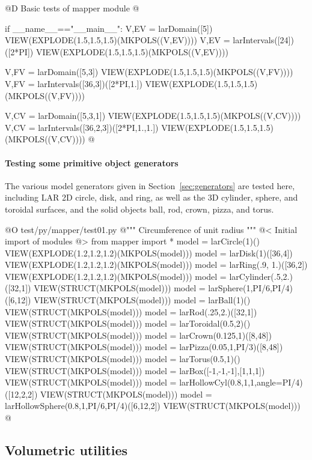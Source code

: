 \documentclass[11pt,oneside]{article}	%
\begin{document}
@D Basic tests of mapper module
@{if __name__=="__main__":
	V,EV = larDomain([5])
	VIEW(EXPLODE(1.5,1.5,1.5)(MKPOLS((V,EV))))
	V,EV = larIntervals([24])([2*PI])
	VIEW(EXPLODE(1.5,1.5,1.5)(MKPOLS((V,EV))))
		
	V,FV = larDomain([5,3])
	VIEW(EXPLODE(1.5,1.5,1.5)(MKPOLS((V,FV))))
	V,FV = larIntervals([36,3])([2*PI,1.])
	VIEW(EXPLODE(1.5,1.5,1.5)(MKPOLS((V,FV))))
		
	V,CV = larDomain([5,3,1])
	VIEW(EXPLODE(1.5,1.5,1.5)(MKPOLS((V,CV))))
	V,CV = larIntervals([36,2,3])([2*PI,1.,1.])
	VIEW(EXPLODE(1.5,1.5,1.5)(MKPOLS((V,CV))))
@}

\paragraph{Testing some primitive object generators}
The various model generators given in Section~\ref{sec:generators} are tested here, including LAR 2D circle, disk, and ring, as well as the 3D cylinder, sphere, and toroidal surfaces, and the solid objects ball, rod, crown, pizza, and torus.

@O test/py/mapper/test01.py
@{""" Circumference of unit radius """
@< Initial import of modules @>
from mapper import *
model = larCircle(1)()
VIEW(EXPLODE(1.2,1.2,1.2)(MKPOLS(model)))
model = larDisk(1)([36,4])
VIEW(EXPLODE(1.2,1.2,1.2)(MKPOLS(model)))
model = larRing(.9, 1.)([36,2])
VIEW(EXPLODE(1.2,1.2,1.2)(MKPOLS(model)))
model = larCylinder(.5,2.)([32,1])
VIEW(STRUCT(MKPOLS(model)))
model = larSphere(1,PI/6,PI/4)([6,12])
VIEW(STRUCT(MKPOLS(model)))
model = larBall(1)()
VIEW(STRUCT(MKPOLS(model)))
model = larRod(.25,2.)([32,1])
VIEW(STRUCT(MKPOLS(model)))
model = larToroidal(0.5,2)()
VIEW(STRUCT(MKPOLS(model)))
model = larCrown(0.125,1)([8,48])
VIEW(STRUCT(MKPOLS(model)))
model = larPizza(0.05,1,PI/3)([8,48])
VIEW(STRUCT(MKPOLS(model)))
model = larTorus(0.5,1)()
VIEW(STRUCT(MKPOLS(model)))
model = larBox([-1,-1,-1],[1,1,1])
VIEW(STRUCT(MKPOLS(model)))
model = larHollowCyl(0.8,1,1,angle=PI/4)([12,2,2])
VIEW(STRUCT(MKPOLS(model)))
model = larHollowSphere(0.8,1,PI/6,PI/4)([6,12,2])
VIEW(STRUCT(MKPOLS(model)))
@}


\subsection{Volumetric utilities}
\end{document}
